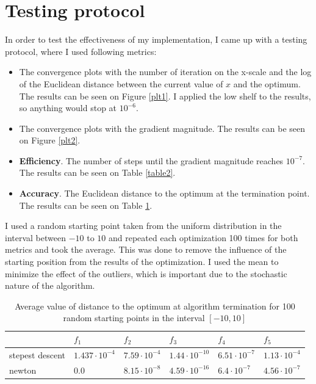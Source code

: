\documentclass[a4paper]{article}
\begin{document}
\section{Testing protocol}
In order to test the effectiveness of my implementation, I came up with a
testing protocol, where I used following metrics:

\begin{itemize}
\item The convergence plots with the number of iteration on the x-scale and the
  log of the Euclidean distance between the current value of $x$ and the
  optimum. The results can be seen on Figure \ref{plt1}. I applied the low shelf
  to the results, so anything would stop at $10^{-6}$.
\item The convergence plots with the gradient magnitude.
  The results can be seen on Figure \ref{plt2}. 
\item \textbf{Efficiency}. The number of steps until the gradient magnitude reaches $10^{-7}$. The
  results can be seen on Table \ref{table2}.
\item \textbf{Accuracy}. The Euclidean distance to the optimum at the
  termination point. The results can be seen on Table \ref{table1}.
\end{itemize}
I used a random starting point taken from the uniform distribution in the
interval between $-10$ to $10$ and repeated each optimization 100 times for both
metrics and took the average. This was done to remove the influence of the
starting position from the results of the optimization. I used the mean 
to minimize the effect of the outliers,
which is important due to the stochastic nature of the algorithm. 
\begin{table}[]
\centering
\begin{tabular}{|l|l|l|l|l|l|}
\hline
                 & $f_1$         & $f_2$         & $f_3$       & $f_4$       & $f_5$       \\ \hline
stepest descent & $1.437\cdot10^{-4}$ & $7.59\cdot10^{-4}$ & $1.44\cdot10^{-10}$ & $6.51\cdot10^{-7}$ & $1.13\cdot 10^{-4}$ \\ \hline
newton           & $0.0$      & $8.15\cdot10^{-8}$ & $4.59\cdot10^{-16}$ & $6.4\cdot10^{-7}$  & $4.56\cdot10^{-7}$ \\ \hline
\end{tabular}
\caption{Average value of distance to the optimum at algorithm termination for 100 random starting points in the interval $[-10,10]$}
\label{table1}
\end{table}
\end{document}
